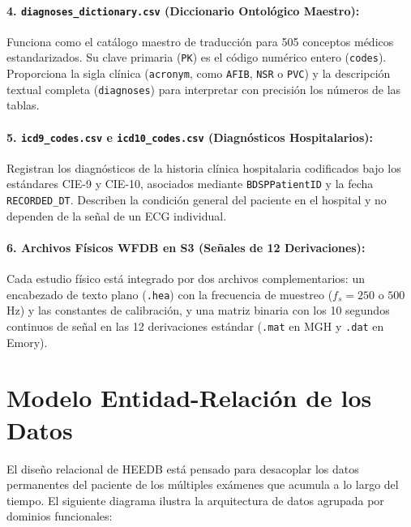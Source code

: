 \documentclass[11pt,a4paper]{article}
\begin{document}
\paragraph{4. \texttt{diagnoses\_dictionary.csv} (Diccionario Ontológico Maestro):}
Funciona como el catálogo maestro de traducción para 505 conceptos médicos estandarizados. Su clave primaria (\texttt{PK}) es el código numérico entero (\texttt{codes}). Proporciona la sigla clínica (\texttt{acronym}, como \texttt{AFIB}, \texttt{NSR} o \texttt{PVC}) y la descripción textual completa (\texttt{diagnoses}) para interpretar con precisión los números de las tablas.

\paragraph{5. \texttt{icd9\_codes.csv} e \texttt{icd10\_codes.csv} (Diagnósticos Hospitalarios):}
Registran los diagnósticos de la historia clínica hospitalaria codificados bajo los estándares CIE-9 y CIE-10, asociados mediante \texttt{BDSPPatientID} y la fecha \texttt{RECORDED\_DT}. Describen la condición general del paciente en el hospital y no dependen de la señal de un ECG individual.

\paragraph{6. Archivos Físicos WFDB en S3 (Señales de 12 Derivaciones):}
Cada estudio físico está integrado por dos archivos complementarios: un encabezado de texto plano (\texttt{.hea}) con la frecuencia de muestreo ($f_s = 250$ o $500$ Hz) y las constantes de calibración, y una matriz binaria con los 10 segundos continuos de señal en las 12 derivaciones estándar (\texttt{.mat} en MGH y \texttt{.dat} en Emory).
\newpage

\section{Modelo Entidad-Relación de los Datos}

El diseño relacional de HEEDB está pensado para desacoplar los datos permanentes del paciente de los múltiples exámenes que acumula a lo largo del tiempo. El siguiente diagrama ilustra la arquitectura de datos agrupada por dominios funcionales:
\end{document}
